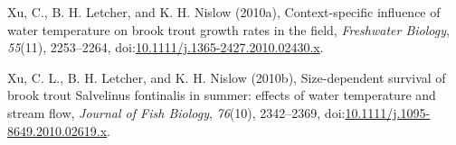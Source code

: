 \hypertarget{ref-Xu2010}{}
Xu, C., B. H. Letcher, and K. H. Nislow (2010a), Context-specific
influence of water temperature on brook trout growth rates in the field,
\emph{Freshwater Biology}, \emph{55}(11), 2253--2264,
doi:\href{https://doi.org/10.1111/j.1365-2427.2010.02430.x}{10.1111/j.1365-2427.2010.02430.x}.

\hypertarget{ref-Xu2010a}{}
Xu, C. L., B. H. Letcher, and K. H. Nislow (2010b), Size-dependent
survival of brook trout Salvelinus fontinalis in summer: effects of
water temperature and stream flow, \emph{Journal of Fish Biology},
\emph{76}(10), 2342--2369,
doi:\href{https://doi.org/10.1111/j.1095-8649.2010.02619.x}{10.1111/j.1095-8649.2010.02619.x}.
